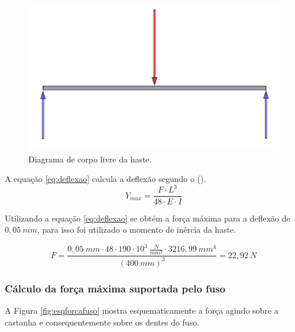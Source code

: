 \begin{figure}[H]
\centering
\caption{Diagrama de corpo livre da haste.}\label{fig:diagramacorpolivre}
\includegraphics[scale = 0.4]{figuras/diagramcorpolivre}
\end{figure}

A equação \ref{eq:deflexao} calcula a deflexão segundo o \citeauthor{budynas2016elementos} (\citeyear{budynas2016elementos}).
\begin{equation}\label{eq:deflexao}
    Y_{max} = \frac{F \cdot L^{3}}{48 \cdot E \cdot I}
\end{equation}

Utilizando a equação \ref{eq:deflexao} se obtém a força máxima para a deflexão de $0,05~mm$, 
para isso foi utilizado o momento de inércia da haste.

$$F = \frac{0,05~mm \cdot 48 \cdot 190 \cdot 10^{3}~\frac{N}{mm^{2}} \cdot 3216,99~mm^{4}}{(400~mm)^{3}} = 22,92~N$$

\subsubsection{Cálculo da força máxima suportada pelo fuso}

A Figura \ref{fig:esqforcafuso} mostra esquematicamente a força agindo sobre a castanha e consequentemente 
sobre os dentes do fuso.

